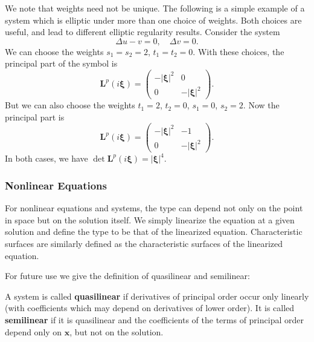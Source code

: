 \begin{Remark}
\label{rem:nonunique-principal-weights}
We note that weights need not be unique. The following is a simple example of a system which is elliptic under more than one choice of weights. Both choices are useful, and lead to different elliptic regularity results. Consider the system
\begin{equation}\label{eq:two-weight-elliptic-system}
\Delta u-v=0,\quad\Delta v=0.
\end{equation}
We can choose the weights $s_1=s_2=2$, $t_1=t_2=0$. With these choices, the principal part of the symbol is
\begin{equation}\label{eq:first-choice-weighted-principal-symbol}
\bm{L}^p(i\bm{\xi})=\begin{pmatrix}-|\bm{\xi}|^2&0\\0&-|\bm{\xi}|^2\end{pmatrix}.
\end{equation}
But we can also choose the weights $t_1=2$, $t_2=0$, $s_1=0$, $s_2=2$. Now the principal part is
\begin{equation}\label{eq:second-choice-weighted-principal-symbol}
\bm{L}^p(i\bm{\xi})=\begin{pmatrix}-|\bm{\xi}|^2&-1\\0&-|\bm{\xi}|^2\end{pmatrix}.
\end{equation}
In both cases, we have $\det\bm{L}^p(i\bm{\xi})=|\bm{\xi}|^4$.
\end{Remark}

\subsubsection{Nonlinear Equations}\label{subsec:nonlinear-classification}

For nonlinear equations and systems, the type can depend not only on the point in space but on the solution itself. We simply linearize the equation at a given solution and define the type to be that of the linearized equation. Characteristic surfaces are similarly defined as the characteristic surfaces of the linearized equation.

For future use we give the definition of quasilinear and semilinear:

\begin{Definition}
\label{def:quasilinear-semilinear}
A system is called \textbf{quasilinear} if derivatives of principal order occur only linearly (with coefficients which may depend on derivatives of lower order). It is called \textbf{semilinear} if it is quasilinear and the coefficients of the terms of principal order depend only on $\bm{x}$, but not on the solution.
\end{Definition}

